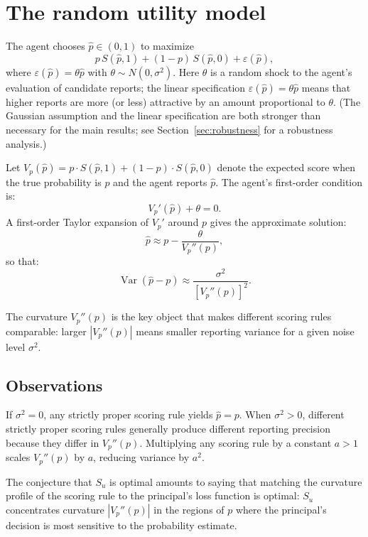 \documentclass[11pt]{article}
\begin{document}
\section{The random utility model}\label{sec:random-utility}

The agent chooses $\hat{p} \in (0, 1)$ to maximize
\[
p \, S(\hat{p}, 1) + (1 - p) \, S(\hat{p}, 0) + \varepsilon(\hat{p}),
\]
where $\varepsilon(\hat{p}) = \theta \hat{p}$ with $\theta \sim N(0, \sigma^2)$. Here $\theta$ is a random shock to the agent's evaluation of candidate reports; the linear specification $\varepsilon(\hat{p}) = \theta \hat{p}$ means that higher reports are more (or less) attractive by an amount proportional to $\theta$. (The Gaussian assumption and the linear specification are both stronger than necessary for the main results; see Section~\ref{sec:robustness} for a robustness analysis.)

Let $V_p(\hat{p}) = p \cdot S(\hat{p}, 1) + (1 - p) \cdot S(\hat{p}, 0)$ denote the expected score when the true probability is $p$ and the agent reports $\hat{p}$. The agent's first-order condition is:
\[
V_p'(\hat{p}) + \theta = 0.
\]
A first-order Taylor expansion of $V_p'$ around $p$ gives the approximate solution:
\begin{equation}\label{eq:approx-phat}
\hat{p} \approx p - \frac{\theta}{V_p''(p)},
\end{equation}
so that:
\begin{equation}\label{eq:var-phat}
\operatorname{Var}(\hat{p} - p) \approx \frac{\sigma^2}{[V_p''(p)]^2}.
\end{equation}

The curvature $V_p''(p)$ is the key object that makes different scoring rules comparable: larger $|V_p''(p)|$ means smaller reporting variance for a given noise level $\sigma^2$.

\subsection*{Observations}

If $\sigma^2 = 0$, any strictly proper scoring rule yields $\hat{p} = p$. When $\sigma^2 > 0$, different strictly proper scoring rules generally produce different reporting precision because they differ in $V_p''(p)$. Multiplying any scoring rule by a constant $a > 1$ scales $V_p''(p)$ by $a$, reducing variance by $a^2$.

The conjecture that $S_u$ is optimal amounts to saying that matching the curvature profile of the scoring rule to the principal's loss function is optimal: $S_u$ concentrates curvature $|V_p''(p)|$ in the regions of $p$ where the principal's decision is most sensitive to the probability estimate.
\end{document}
